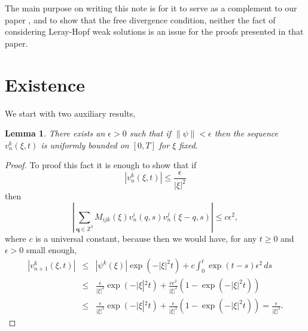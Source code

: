 \documentclass{amsart}
\newtheorem{lemma}{Lemma}
\begin{document}
The main purpose on writing this note is for it to serve as a complement to our
paper \cite{Cortissoz}, and to show that the free divergence condition, neither the fact of
considering Leray-Hopf weak solutions is an issue for the proofs presented in that paper.  
 
\section{Existence}

We start with two auxiliary results,
\begin{lemma}
There exists an $\epsilon>0$ such that if $\left\|\psi\right\|<\epsilon$ then
the sequence $v_n^k\left(\xi,t\right)$ is uniformly bounded on $\left[0,T\right]$ for $\xi$
fixed.
\end{lemma}
\begin{proof}
To proof this fact it is enough to show that if 
\[
\left|v_{n}^k\left(\xi,t\right)\right|\leq \frac{\epsilon}{\left|\xi\right|^2}
\]
then 
\begin{equation}
\label{sumbound}
\left|\sum_{\mathbf{q}\in\mathbb{Z}^3}
M_{ijk}\left(\xi\right)v_n^i\left(q,s\right)v_n^j\left(\xi-q,s\right)\right|\leq c\epsilon^2,
\end{equation}
where $c$ is a universal constant, 
because then we would have, for any $t\geq 0$ and $\epsilon>0$ small enough,
\begin{eqnarray*}
\left|v_{n+1}^k\left(\xi,t\right)\right|&\leq&
\left|\psi^{k}\left(\xi\right)\right|\exp\left(-\left|\xi\right|^2 t\right)+
c\int_0^t \exp\left(t-s\right)\epsilon^2 \,ds\\
&\leq& \frac{\epsilon}{\left|\xi\right|^2}\exp\left(-\right|\xi\left|^2 t\right)+
\frac{c\epsilon^2}{\left|\xi\right|^2}\left(1-\exp\left(-\left|\xi\right|^2 t\right)\right)\\
&\leq& \frac{\epsilon}{\left|\xi\right|^2}\exp\left(-\right|\xi\left|^2 t\right)+
\frac{\epsilon}{\left|\xi\right|^2}\left(1-\exp\left(-\left|\xi\right|^2 t\right)\right)=
\frac{\epsilon}{\left|\xi\right|^2}.
\end{eqnarray*}


\end{proof}
\end{document}

